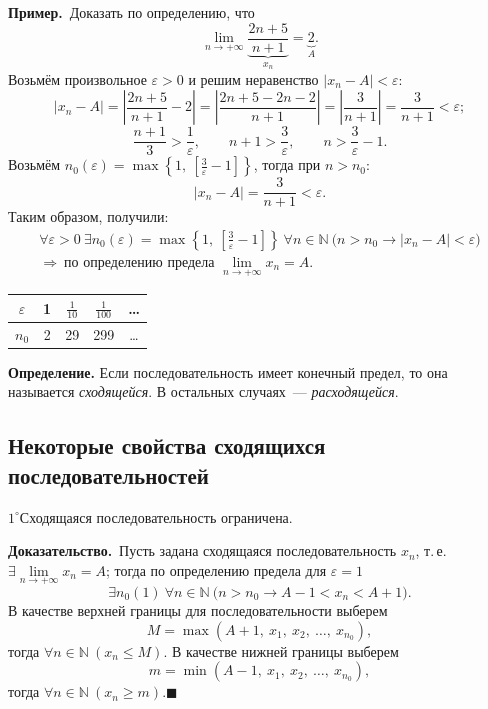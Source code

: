 \documentclass[a4paper,11pt]{article}
\newcommand{\prim}{\textbf{Пример.}\ }
\newcommand{\dok}{\textbf{Доказательство.}\ }
\newcommand{\qedr}{\hfill$\blacksquare$}
\begin{document}
\prim Доказать по определению, что
\[
  \lim_{n \to +\infty} \underbrace{\frac{2n + 5}{n + 1}}_{x_n} = \underbrace{2}_{A}.
\]
Возьмём произвольное $\varepsilon > 0$ и решим неравенство
$|x_n - A| < \varepsilon$:
\[
  |x_n - A| = \left| \frac{2n + 5}{n + 1} - 2 \right|
            = \left| \frac{2n + 5 - 2n - 2}{n + 1} \right|
            = \left| \frac{3}{n + 1} \right| = \frac{3}{n + 1} < \varepsilon;
\]
\[
  \frac{n + 1}{3} > \frac{1}{\varepsilon}, \qquad
  n + 1 > \frac{3}{\varepsilon}, \qquad
  n > \frac{3}{\varepsilon} - 1.
\]
Возьмём $n_0(\varepsilon) = \max\left\{1,\ \left[\tfrac{3}{\varepsilon} - 1\right]\right\}$,
тогда при $n > n_0$:
\[
  |x_n - A| = \frac{3}{n + 1} < \varepsilon.
\]
Таким образом, получили:
\begin{gather*}
  \forall \varepsilon > 0\ \exists n_0(\varepsilon) = \max\left\{1,\ \left[\tfrac{3}{\varepsilon} - 1\right]\right\}\
  \forall n \in \mathbb{N}\ \big(n > n_0 \to |x_n - A| < \varepsilon\big)\\
  \Longrightarrow\ \text{по определению предела } \lim_{n \to +\infty} x_n = A.
\end{gather*}
\begin{center}
\begin{tabular}{c|c|c|c|c}
  $\varepsilon$ & 1 & $\frac{1}{10}$ & $\frac{1}{100}$ & \dots \\ \hline
  $n_0$         & 2 & 29             & 299             & \dots \\
\end{tabular}
\end{center}

\begin{opr}
\textbf{Определение.} Если последовательность имеет конечный предел, то она называется
\emph{сходящейся}. В остальных случаях~--- \emph{расходящейся}.
\end{opr}

\subsection{Некоторые свойства сходящихся последовательностей}

\begin{svoi}{$1^\circ$}Сходящаяся последовательность ограничена.
\end{svoi}

\dok Пусть задана сходящаяся последовательность $x_n$, т.\,е.
$\exists \lim\limits_{n \to +\infty} x_n = A$; тогда по определению предела
для $\varepsilon = 1$
\[
  \exists n_0(1)\ \forall n \in \mathbb{N}\ \big(n > n_0 \to A - 1 < x_n < A + 1\big).
\]
В качестве верхней границы для последовательности выберем
\[
  M = \max(A + 1,\ x_1,\ x_2,\ \dots,\ x_{n_0}),
\]
тогда $\forall n \in \mathbb{N}\ (x_n \le M)$. В качестве нижней границы
выберем
\[
  m = \min(A - 1,\ x_1,\ x_2,\ \dots,\ x_{n_0}),
\]
тогда $\forall n \in \mathbb{N}\ (x_n \ge m)$.\qedr
\end{document}
